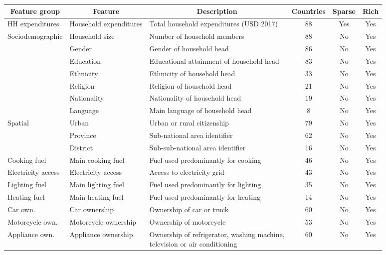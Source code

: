 \begin{table}[ht!]
  \centering
\begin{adjustbox}{width=1\textwidth}
\begin{tabular}[]{l|l|l|c|c|c}
\toprule
\multicolumn{1}{c}{Feature group} & \multicolumn{1}{c}{Feature} & \multicolumn{1}{c}{Description} & \multicolumn{1}{c}{Countries} & \multicolumn{1}{c}{Sparse} & \multicolumn{1}{c}{Rich} \\ \hline
     
        HH expenditures & Household expenditures & Total household expenditures (USD 2017) & 88 & Yes & Yes \\ \hline
        Sociodemographic & Household size & Number of household members & 88 & No & Yes \\ 
         & Gender & Gender of household head & 86 & No & Yes\\ 
         & Education & Educational attainment of household head & 83 & No & Yes\\
         & Ethnicity & Ethnicity of household head & 33 & No & Yes\\
         & Religion & Religion of household head & 21 & No & Yes\\
         & Nationality & Nationality of household head & 19 & No & Yes\\
         & Language & Main language of household head & 8 & No & Yes \\ \hline

         Spatial & Urban & Urban or rural citizenship & 79 & No & Yes\\
        & Province & Sub-national area identifier & 62 & No & Yes\\
        & District & Sub-sub-national area identifier & 16 & No & Yes\\ \hline
        Cooking fuel & Main cooking fuel & Fuel used predominantly for cooking & 46 & No & Yes\\
        Electricity access & Electricity access & Access to electricity grid & 43 & No & Yes\\
        Lighting fuel & Main lighting fuel & Fuel used predominantly for lighting & 35 & No & Yes\\
        Heating fuel & Main heating fuel & Fuel used predominantly for heating & 14 & No & Yes\\
        Car own. & Car ownership & Ownership of car or truck & 60 & No & Yes\\
        Motorcycle own. & Motorcycle ownership & Ownership of motorcycle & 53 & No & Yes\\
        Appliance own. & Appliance ownership & \makecell[tl]{Ownership of refrigerator, washing machine, \\ television or air conditioning} & 60 & No & Yes\\
        \bottomrule
\end{tabular}


\end{adjustbox}
\end{table}
